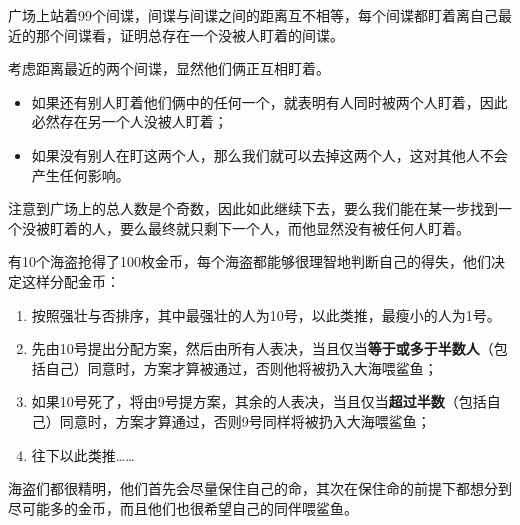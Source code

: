 \begin{questions}
    \question 广场上站着99个间谍，间谍与间谍之间的距离互不相等，每个间谍都盯着离自己最近的那个间谍看，证明总存在一个没被人盯着的间谍。

    \begin{solution}
        考虑距离最近的两个间谍，显然他们俩正互相盯着。
        \begin{itemize}
            \item 如果还有别人盯着他们俩中的任何一个，就表明有人同时被两个人盯着，因此必然存在另一个人没被人盯着；
            \item 如果没有别人在盯这两个人，那么我们就可以去掉这两个人，这对其他人不会产生任何影响。
        \end{itemize}

        注意到广场上的总人数是个奇数，因此如此继续下去，要么我们能在某一步找到一个没被盯着的人，要么最终就只剩下一个人，而他显然没有被任何人盯着。
    \end{solution}

    \question 有10个海盗抢得了100枚金币，每个海盗都能够很理智地判断自己的得失，他们决定这样分配金币：
    \begin{enumerate}
        \item 按照强壮与否排序，其中最强壮的人为10号，以此类推，最瘦小的人为1号。
        \item 先由10号提出分配方案，然后由所有人表决，当且仅当\textbf{等于或多于半数人}（包括自己）同意时，方案才算被通过，否则他将被扔入大海喂鲨鱼；
        \item 如果10号死了，将由9号提方案，其余的人表决，当且仅当\textbf{超过半数}（包括自己）同意时，方案才算通过，否则9号同样将被扔入大海喂鲨鱼；
        \item 往下以此类推……
    \end{enumerate}
    海盗们都很精明，他们首先会尽量保住自己的命，其次在保住命的前提下都想分到尽可能多的金币，而且他们也很希望自己的同伴喂鲨鱼。




\end{questions}
